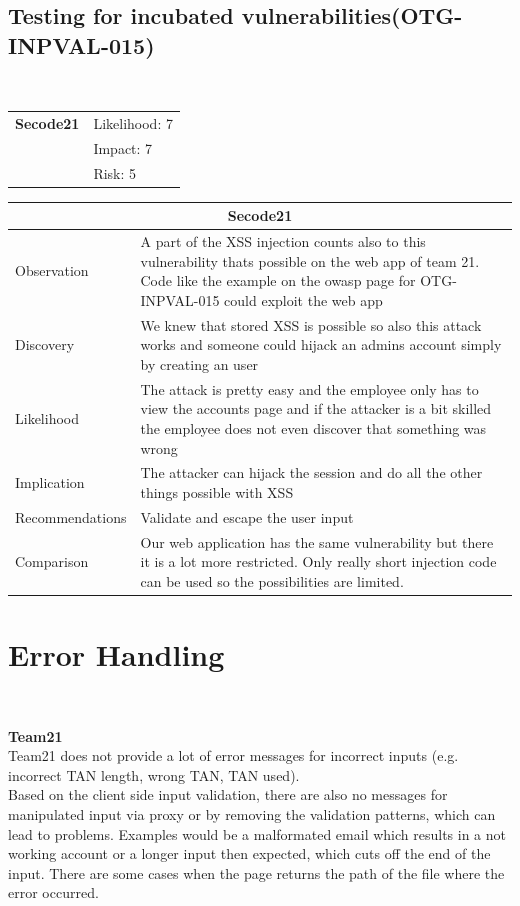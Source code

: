 \documentclass[headsepline,footsepline,footinclude=false,oneside,fontsize=11pt,paper=a4,listof=totoc,bibliography=totoc]{scrbook} %
\begin{document}
\pagebreak
\subsection{Testing for incubated vulnerabilities(OTG-INPVAL-015)}\

\begin{tabular}{cR{12cm}}
	\textbf{Secode21} & Likelihood: 7\\& Impact: 7\\& Risk: 5
\end{tabular}

\begin{tabular}{ l|p{11cm}  }
	\hline
	\multicolumn{2}{c}{\textbf{Secode21}} \\
	\hline
	Observation   & A part of the XSS injection counts also to this vulnerability thats possible on the web app of
	team 21. Code like the example on the owasp page for OTG-INPVAL-015 could exploit the web app\\
	Discovery  & We knew that stored XSS is possible so also this attack works and someone could hijack an
	admins account simply by creating an user\\
	Likelihood & The attack is pretty easy and the employee only has to view the accounts
	page and if the attacker is a bit skilled the employee does not even discover that something was wrong \\
	Implication    & The attacker can hijack the session and do all the other things possible with XSS\\
	Recommendations & Validate and escape the user input \\
	Comparison& Our web application has the same vulnerability but there it is a lot more restricted.
	Only really short injection code can be used so the possibilities are limited. \\
	\hline
\end{tabular}

\section{Error Handling}\

\textbf{Team21}\\

Team21 does not provide a lot of error messages for incorrect inputs (e.g. incorrect TAN
length, wrong TAN, TAN used). \\
Based on the client side input validation, there are also no messages for manipulated input via proxy or by removing the validation patterns, which can lead to problems. Examples would be a malformated email which results in a not working account or a longer input then expected, which cuts off the end of the input. There are some cases when the page returns the path of the file where the error occurred.\\
\end{document}
